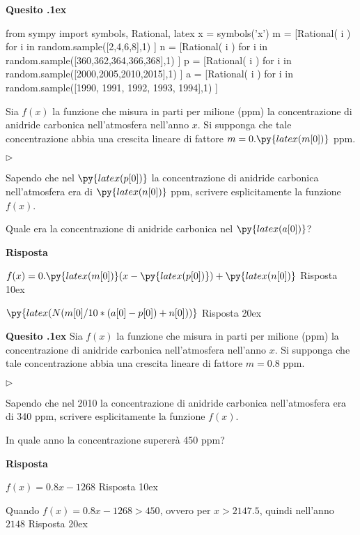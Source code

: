 \documentclass[11pt,twoside,a4paper]{article}
\newcommand{\mylabel}[1]{#1\hfill}
\renewenvironment{itemize}
  {\begin{list}{$\triangleright$}{%
   \setlength{\parskip}{0mm}
   \setlength{\topsep}{.4\baselineskip}
   \setlength{\rightmargin}{0mm}
   \setlength{\listparindent}{0mm}
   \setlength{\itemindent}{0mm}
   \setlength{\labelwidth}{2ex}
   \setlength{\itemsep}{.4\baselineskip}
   \setlength{\parsep}{0mm}
   \setlength{\partopsep}{0mm}
   \setlength{\labelsep}{1ex}
   \setlength{\leftmargin}{\labelwidth+\labelsep}
   \let\makelabel\mylabel}}{%
   \end{list}\vspace*{-1.3mm}}
\newcounter{quesito}
\newenvironment{question}{\bigskip\addtocounter{quesito}{1}\bigskip\bigskip\par\textbf{Quesito \thequesito.\kern1ex}}{\vspace{\parskip}}
\newenvironment{answer}{\par\textbf{Risposta\quad}}{\vspace{\parskip}}
\begin{document}
\begin{question}
\begin{pycode}
from sympy import symbols, Rational, latex
x = symbols('x')
m = [Rational( i ) for i in random.sample([2,4,6,8],1) ]
n = [Rational( i ) for i in random.sample([360,362,364,366,368],1) ]
p = [Rational( i ) for i in random.sample([2000,2005,2010,2015],1) ]
a = [Rational( i ) for i in random.sample([1990, 1991, 1992, 1993, 1994],1) ]
\end{pycode}
Sia $f(x)$ la funzione che misura in parti per milione (ppm) la concentrazione di anidride carbonica nell'atmosfera nell'anno $x$. Si supponga che tale concentrazione abbia una crescita lineare di fattore $m = 0.\py{latex(m[0])}$ ppm.
\begin{itemize}
\item[1.] Sapendo che nel $\py{latex(p[0])}$ la concentrazione di anidride carbonica nell'atmosfera era di $\py{latex(n[0])}$ ppm, scrivere esplicitamente la funzione $f(x)$.
\item[2.] Quale era la concentrazione di anidride carbonica nel $\py{latex(a[0])}$?
\end{itemize}
\begin{answer}

\smallskip
{\color{blue}
$f(x) = 0.\py{latex(m[0])} ( x - \py{latex(p[0])}) + \py{latex(n[0])}$
\hfill Risposta 1\kern0ex}

{\color{blue}
$\py{latex(N(m[0]/10*(a[0]-p[0])+n[0]))}$
\hfill Risposta 2\kern0ex}

\end{answer}
\end{question}
\begin{question}
Sia $f(x)$ la funzione che misura in parti per milione (ppm) la concentrazione di anidride carbonica nell'atmosfera nell'anno $x$. Si supponga che tale concentrazione abbia una crescita lineare di fattore $m = 0.8$ ppm.
\begin{itemize}
\item[1.] Sapendo che nel 2010 la concentrazione di anidride carbonica nell'atmosfera era di 340 ppm, scrivere esplicitamente la funzione $f(x)$.
\item[2.] In quale anno la concentrazione supererà 450 ppm?
\end{itemize}
\begin{answer}

\smallskip
{\color{blue}
$f(x) = 0.8 x - 1268$
\hfill Risposta 1\kern0ex}

Quando $f(x) = 0.8x - 1268 > 450$, ovvero per $x > 2147.5$, quindi nell'anno
{\color{blue}
$2148$
\hfill Risposta 2\kern0ex}

\end{answer}
\end{question}
\end{document}
